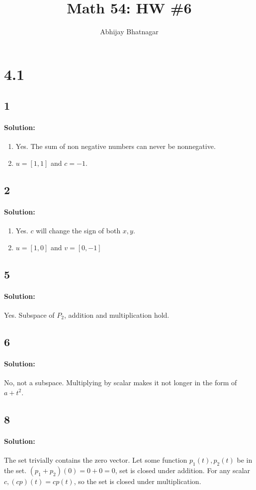 \documentclass[11pt, notitlepage]{report}
\makeatletter
\newenvironment{solution}{\paragraph{Solution:}}{\hfill}
\newcommand*{\toccontents}{\@starttoc{toc}}
\makeatother
\begin{document}
   \title{Math 54: HW \#6}
   \author{Abhijay Bhatnagar}
   \maketitle
   \toccontents


\setcounter{secnumdepth}{0} %
\section{4.1}
\subsection{1}
\begin{solution}
\begin{enumerate}[label=\alph*.)]
\item Yes. The sum of non negative numbers can never be nonnegative.
\item $u=[1,1]$ and $c=-1$. 
\end{enumerate}
\end{solution}
\subsection{2}
\begin{solution}
\begin{enumerate}[label=\alph*.)]
\item Yes. $c$ will change the sign of both $x,y$.
\item $u=[1,0]$ and $v=[0,-1]$
\end{enumerate}
\end{solution}
\subsection{5}
\begin{solution}
Yes. Subspace of $P_2$, addition and multiplication hold.
\end{solution}
\subsection{6}
\begin{solution}
   No, not a subspace. Multiplying by scalar makes it not longer in the form of $a+t^2$.
\end{solution}
\subsection{8}
\begin{solution}
   The set trivially contains the zero vector.
   Let some function $p_1(t),p_2(t)$ be in the set. $(p_1+p_2)(0) = 0+0=0$, set is closed under addition. For any scalar $c, (cp)(t) = cp(t)$, so the set is closed under multiplication.
\end{solution}
\end{document}
